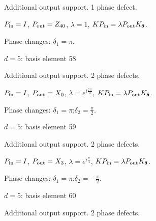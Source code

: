 Additional output support. 1 phase defect.
\begin{center}
\end{center}
\vspace{-1mm}
$P_{\rm in}=I$, \quad $P_{\rm out}=Z_{40}$, \quad $\lambda=1$, \qquad $K P_{\rm in}=\lambda P_{\rm out}K_{\boldsymbol\delta}$.
\par\smallskip\begin{minipage}{.98\linewidth}\small Phase changes: $\delta_{1}=\pi$.\end{minipage}
\vfill
{\footnotesize\texttt{}}
\newpage
{}
{\Large $d=5$: basis element 58}\par
Additional output support. 2 phase defects.
\begin{center}
\end{center}
\vspace{-1mm}
$P_{\rm in}=I$, \quad $P_{\rm out}=X_{0}$, \quad $\lambda=e^{i\frac{7\pi}{4}}$, \qquad $K P_{\rm in}=\lambda P_{\rm out}K_{\boldsymbol\delta}$.
\par\smallskip\begin{minipage}{.98\linewidth}\small Phase changes: $\delta_{1}=\pi$;\quad $\delta_{2}=\frac{\pi}{2}$.\end{minipage}
\vfill
{\footnotesize\texttt{}}
\newpage
{}
{\Large $d=5$: basis element 59}\par
Additional output support. 2 phase defects.
\begin{center}
\end{center}
\vspace{-1mm}
$P_{\rm in}=I$, \quad $P_{\rm out}=X_{3}$, \quad $\lambda=e^{i\frac{\pi}{4}}$, \qquad $K P_{\rm in}=\lambda P_{\rm out}K_{\boldsymbol\delta}$.
\par\smallskip\begin{minipage}{.98\linewidth}\small Phase changes: $\delta_{1}=\pi$;\quad $\delta_{2}=-\frac{\pi}{2}$.\end{minipage}
\vfill
{\footnotesize\texttt{}}
\newpage
{}
{\Large $d=5$: basis element 60}\par
Additional output support. 2 phase defects.
\begin{center}
\end{center}

